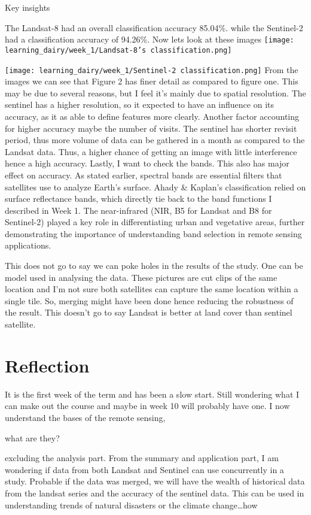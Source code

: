\documentclass[
  letterpaper,
  DIV=11,
  numbers=noendperiod]{scrreprt}
\begin{document}
Key insights

The Landsat-8 had an overall classification accuracy 85.04\%. while the
Sentinel-2 had a classification accuracy of 94.26\%. Now lets look at
these images
\texttt{[image: learning\_dairy/week\_1/Landsat-8’s classification.png]}

\texttt{[image: learning\_dairy/week\_1/Sentinel-2 classification.png]}
From the images we can see that Figure 2 has finer detail as compared to
figure one. This may be due to several reasons, but I feel it's mainly
due to spatial resolution. The sentinel has a higher resolution, so it
expected to have an influence on its accuracy, as it as able to define
features more clearly. Another factor accounting for higher accuracy
maybe the number of visits. The sentinel has shorter revisit period,
thus more volume of data can be gathered in a month as compared to the
Landsat data. Thus, a higher chance of getting an image with little
interference hence a high accuracy. Lastly, I want to check the bands.
This also has major effect on accuracy. As stated earlier, spectral
bands are essential filters that satellites use to analyze Earth's
surface. Ahady \& Kaplan's classification relied on surface reflectance
bands, which directly tie back to the band functions I described in Week
1. The near-infrared (NIR, B5 for Landsat and B8 for Sentinel-2) played
a key role in differentiating urban and vegetative areas, further
demonstrating the importance of understanding band selection in remote
sensing applications.

This does not go to say we can poke holes in the results of the study.
One can be model used in analysing the data. These pictures are cut
clips of the same location and I'm not sure both satellites can capture
the same location within a single tile. So, merging might have been done
hence reducing the robustness of the result. This doesn't go to say
Landsat is better at land cover than sentinel satellite.

\hypertarget{reflection}{%
\section{Reflection}\label{reflection}}

It is the first week of the term and has been a slow start. Still
wondering what I can make out the course and maybe in week 10 will
probably have one. I now understand the bases of the remote sensing,

what are they?

excluding the analysis part. From the summary and application part, I am
wondering if data from both Landsat and Sentinel can use concurrently in
a study. Probable if the data was merged, we will have the wealth of
historical data from the landsat series and the accuracy of the sentinel
data. This can be used in understanding trends of natural disasters or
the climate change\ldots how
\end{document}
